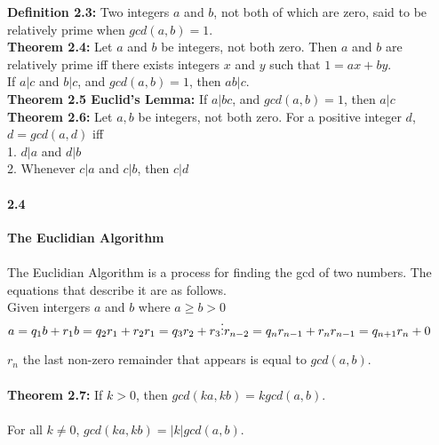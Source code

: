 \documentclass[14pt]{extreport}
\begin{document}
\textbf{Definition 2.3:} Two integers $a$ and $b$, not both of which are zero, said to be relatively prime when $gcd(a,b) = 1$.\\

\textbf{Theorem 2.4:} Let $a$ and $b$ be integers, not both zero. Then $a$ and $b$ are relatively prime iff there exists integers $x$ and $y$ such that $1 = ax+by$.\\

If $a|c$ and  $b|c$, and $gcd(a,b) = 1$, then $ab|c$.\\

\textbf{Theorem 2.5 Euclid's Lemma:} If $a|bc$, and $gcd(a,b) = 1$, then $a|c$\\

\textbf{Theorem 2.6:} Let $a, b$ be integers, not both zero. For a positive integer $d$,  $d = gcd(a,d)$ iff\\

1. $d|a$ and $d|b$\\
2. Whenever $c|a$ and $c|b$, then $c|d$\\

\paragraph{2.4} \textbf{The Euclidian Algorithm}\\\\

The Euclidian Algorithm is a process for finding the gcd of two numbers. The equations that describe it are as follows. \\

Given intergers $a$ and $b$ where $a \ge b > 0$\\

$a = q_1b + r_1\\
b = q_2r_1 + r_2\\
r_1 = q_3r_2 + r_3\\
\vdots\\
r_{n-2} = q_nr_{n-1} + r_n\\
r_{n-1} = q_{n+1}r_n + 0\\$

$r_n$ the last non-zero remainder that appears is equal to $gcd(a, b)$.\\\\

\textbf{Theorem 2.7: } If $k > 0$, then $gcd(ka, kb) = k gcd(a,b)$.\\\\

For all $k \ne 0$, $gcd(ka, kb) = |k|gcd(a,b)$.\\\\
\end{document}
